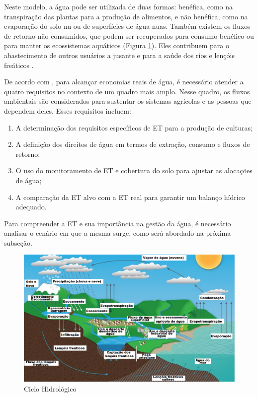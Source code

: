 Neste modelo, a água pode ser utilizada de duas formas: benéfica, como na transpiração das plantas para a produção de alimentos, e não benéfica, como na evaporação do solo nu ou de superfícies de água nuas. Também existem os fluxos de retorno não consumidos, que podem ser recuperados para consumo benéfico ou para manter os ecossistemas aquáticos (Figura \ref{figura:ciclo_agua}). Eles contribuem para o abastecimento de outros usuários a jusante e para a saúde dos rios e lençóis freáticos \parencite{carmody_fao2023}.

De acordo com \textcite{carmody_fao2023}, para alcançar economias reais de água, é necessário atender a quatro requisitos no contexto de um quadro mais amplo. Nesse quadro, os fluxos ambientais são considerados para sustentar os sistemas agrícolas e as pessoas que dependem deles. Esses requisitos incluem:

\begin{enumerate}
\item A determinação dos requisitos específicos de ET para a produção de culturas;
\item A definição dos direitos de água em termos de extração, consumo e fluxos de retorno;
\item O uso do monitoramento de ET e cobertura do solo para ajustar as alocações de água;
\item A comparação da ET alvo com a ET real para garantir um balanço hídrico adequado.
\end{enumerate}

Para compreender a ET e sua importância na gestão da água, é necessário analisar o cenário em que a mesma surge, como será abordado na próxima subseção.

\begin{figure}[!htb] \centering
  \caption{Ciclo Hidrológico} \label{figura:ciclo_agua}
  \begin{varwidth}{\linewidth}
    \includegraphics[width=16cm]{figuras/Carmody.png}
  \end{varwidth}
\end{figure}


